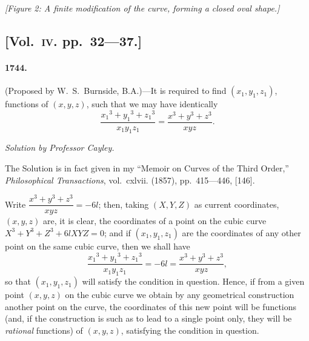 \documentclass[11pt,a4paper]{article}
\begin{document}
\begin{center}
\textit{[Figure 2: A finite modification of the curve, forming a closed oval shape.]}
\end{center}

\subsection*{[Vol.~\textsc{iv}. pp.\ 32---37.]}

\paragraph*{1744.} (Proposed by W.~S.~Burnside, B.A.)---It is required to find $(x_1, y_1, z_1)$,
functions of $(x, y, z)$, such that we may have identically
\[
\frac{x_1{}^3 + y_1{}^3 + z_1{}^3}{x_1y_1z_1} = \frac{x^3 + y^3 + z^3}{xyz}.
\]

\begin{center}
\textit{Solution by Professor Cayley.}
\end{center}

The Solution is in fact given in my ``Memoir on Curves of the Third Order,''
\textit{Philosophical Transactions}, vol.~cxlvii. (1857), pp.\ 415---446, [146].

Write $\dfrac{x^3+y^3+z^3}{xyz} = -6l$; then, taking $(X, Y, Z)$ as current coordinates, $(x, y, z)$ are,
it is clear, the coordinates of a point on the cubic curve $X^3+Y^3+Z^3+6lXYZ=0$;
and if $(x_1, y_1, z_1)$ are the coordinates of any other point on the same cubic curve, then
we shall have
\[
\frac{x_1{}^3+y_1{}^3+z_1{}^3}{x_1y_1z_1} = -6l = \frac{x^3+y^3+z^3}{xyz},
\]
so that $(x_1, y_1, z_1)$ will satisfy the condition in question. Hence, if from a given point
$(x, y, z)$ on the cubic curve we obtain by any geometrical construction another point
on the curve, the coordinates of this new point will be functions (and, if the construction
is such as to lead to a single point only, they will be \textit{rational} functions) of $(x, y, z)$,
satisfying the condition in question.
\end{document}
